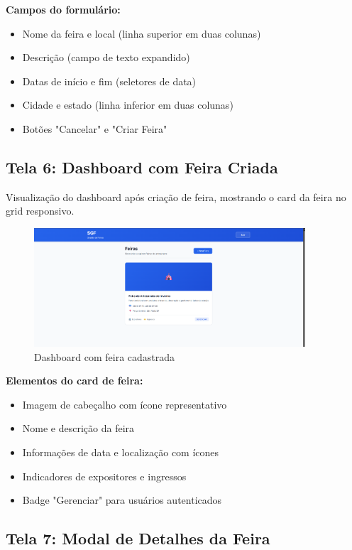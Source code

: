 \documentclass[12pt,a4paper]{article}
\begin{document}
\textbf{Campos do formulário:}
\begin{itemize}
    \item Nome da feira e local (linha superior em duas colunas)
    \item Descrição (campo de texto expandido)
    \item Datas de início e fim (seletores de data)
    \item Cidade e estado (linha inferior em duas colunas)
    \item Botões "Cancelar" e "Criar Feira"
\end{itemize}

\subsection{Tela 6: Dashboard com Feira Criada}

Visualização do dashboard após criação de feira, mostrando o card da feira no grid responsivo.

\begin{figure}[H]
\centering
\includegraphics[width=0.9\textwidth]{wireframes/06_dashboard_com_feira.png}
\caption{Dashboard com feira cadastrada}
\label{fig:dashboard_com_feira}
\end{figure}

\textbf{Elementos do card de feira:}
\begin{itemize}
    \item Imagem de cabeçalho com ícone representativo
    \item Nome e descrição da feira
    \item Informações de data e localização com ícones
    \item Indicadores de expositores e ingressos
    \item Badge "Gerenciar" para usuários autenticados
\end{itemize}

\subsection{Tela 7: Modal de Detalhes da Feira}
\end{document}

